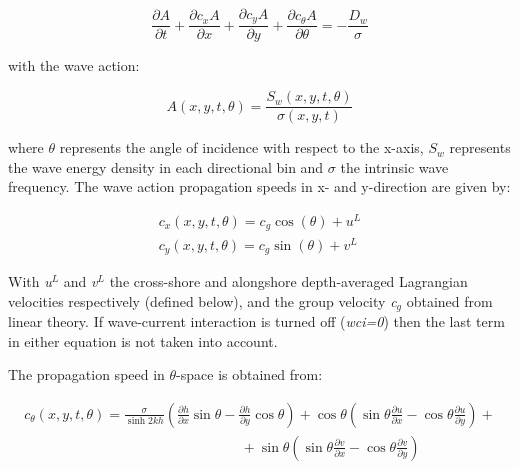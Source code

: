 \begin{equation} \label{ZEqnNum711560} 
\frac{\partial A}{\partial t} +\frac{\partial c_{x} A}{\partial x} +\frac{\partial c_{y} A}{\partial y} +\frac{\partial c_{\theta } A}{\partial \theta } =-\frac{D_{w} }{\sigma }  
\end{equation} 

with the wave action:

\begin{equation} \label{2.2)} 
A(x,y,t,\theta )=\frac{S_{w} (x,y,t,\theta )}{\sigma (x,y,t)}  
\end{equation} 

where $\theta $ represents the angle of incidence with respect to the x-axis, $S_{w}$ represents the wave energy density in each directional bin and $\sigma$ the intrinsic wave frequency. The wave action propagation speeds in x- and y-direction are given by:

\begin{equation} \label{2.3)} 
\begin{array}{l} {c_{x} (x,y,t,\theta )=c_{g} \cos (\theta )+u^{L} } \\ {c_{y} (x,y,t,\theta )=c_{g} \sin (\theta )+v^{L} } \end{array} 
\end{equation} 

With \textit{u${}^{L}$} and \textit{v${}^{L}$} the cross-shore and alongshore depth-averaged Lagrangian velocities respectively (defined below), and the group velocity \textit{c${}_{g}$} obtained from linear theory. If wave-current interaction is turned off (\textit{wci=0}) then the last term in either equation is not taken into account.

The propagation speed in $\theta $-space is obtained from:

\begin{equation} \label{ZEqnNum944441} 
\begin{array}{l} {c_{\theta } (x,y,t,\theta )=\frac{\sigma }{\sinh 2kh} \left(\frac{\partial h}{\partial x} \sin \theta -\frac{\partial h}{\partial y} \cos \theta \right)+\cos \theta \left(\sin \theta \frac{\partial u}{\partial x} -\cos \theta \frac{\partial u}{\partial y} \right)+} \\ {\, \, \, \, \, \, \, \, \, \, \, \, \, \, \, \, \, \, \, \, \, \, \, \, \, \, \, \, \, \, \, \, \, \, \, \, \, \, \, \, \, \, \, \, \, \, \, \, \, \, \, \, \, \, \, \, \, \, \, \, \, \, \, \, \, \, \, \, \, \, \, \, \, \, \, \, \, \, \, \, \, \, \, \, \, \, \, \, \, \, \, \, \, +\sin \theta \left(\sin \theta \frac{\partial v}{\partial x} -\cos \theta \frac{\partial v}{\partial y} \right)} \end{array} 
\end{equation} 

